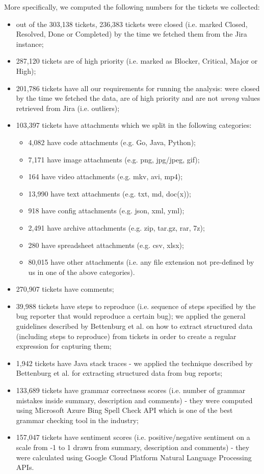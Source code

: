 \documentclass{mpaper}
\begin{document}
More specifically, we computed the following numbers for the tickets we collected:
\begin{itemize}
  \item out of the 303,138 tickets, 236,383 tickets were closed (i.e. marked Closed, Resolved, Done or Completed) by the time we 
  fetched them from the Jira instance;
  \item 287,120 tickets are of high priority (i.e. marked as Blocker, Critical, Major or High);
  \item 201,786 tickets have all our requirements for running the analysis: were closed by the time we fetched the data, 
  are of high priority and are not \emph{wrong} values retrieved from Jira (i.e. outliers);
  \item 103,397 tickets have attachments which we split in the following categories:
    \begin{itemize}
      \item 4,082 have code attachments (e.g. Go, Java, Python);
      \item 7,171 have image attachments (e.g. png, jpg/jpeg, gif);
      \item 164 have video attachments (e.g. mkv, avi, mp4);
      \item 13,990 have text attachments (e.g. txt, md, doc(x));
      \item 918 have config attachments (e.g. json, xml, yml);
      \item 2,491 have archive attachments (e.g. zip, tar.gz, rar, 7z);
      \item 280 have spreadsheet attachments (e.g. csv, xlsx);
      \item 80,015 have other attachments (i.e. any file extension not pre-defined by us in one of the above categories).
    \end{itemize}
  \item 270,907 tickets have comments;
  \item 39,988 tickets have steps to reproduce (i.e. sequence of steps specified by the bug reporter that would reproduce a certain bug); 
  we applied the general guidelines described by Bettenburg et al. \cite{bettenburg2008extracting} on how to extract structured 
  data (including steps to reproduce) from tickets in order to create a regular expression for capturing them;
  \item 1,942 tickets have Java stack traces - we applied the technique described by Bettenburg et al. 
  \cite{bettenburg2008extracting} for extracting structured data from bug reports;
  \item 133,689 tickets have grammar correctness scores (i.e. number of grammar mistakes inside summary, description and comments) - 
  they were computed using Microsoft Azure Bing Spell Check API which is one of the best grammar checking tool in the industry; 
  \item 157,047 tickets have sentiment scores (i.e. positive/negative sentiment on a scale from -1 to 1 drawn from summary, description
  and comments) - they were calculated using Google Cloud Platform Natural Language Processing APIs.
\end{itemize}
\end{document}
